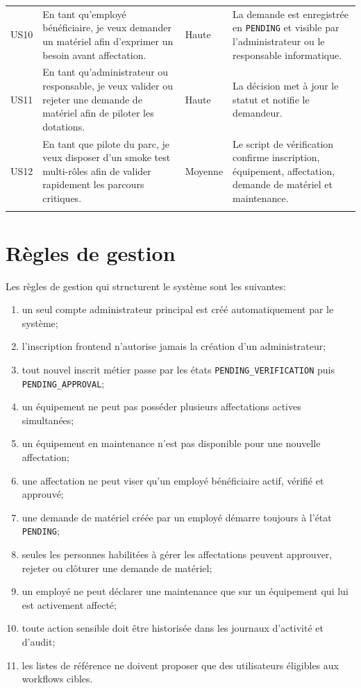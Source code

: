 ﻿\documentclass[12pt,a4paper,oneside]{report}
\begin{document}
\begin{longtable}{p{1.5cm}p{4.8cm}p{3cm}p{5.1cm}}
US10 & En tant qu'employé bénéficiaire, je veux demander un matériel afin d'exprimer un besoin avant affectation. & Haute & La demande est enregistrée en \texttt{PENDING} et visible par l'administrateur ou le responsable informatique. \\
US11 & En tant qu'administrateur ou responsable, je veux valider ou rejeter une demande de matériel afin de piloter les dotations. & Haute & La décision met à jour le statut et notifie le demandeur. \\
US12 & En tant que pilote du parc, je veux disposer d'un smoke test multi-rôles afin de valider rapidement les parcours critiques. & Moyenne & Le script de vérification confirme inscription, équipement, affectation, demande de matériel et maintenance. \\
\bottomrule
\label{tab:user-stories}
\end{longtable}

\section{Règles de gestion}
Les règles de gestion qui structurent le système sont les suivantes:
\begin{enumerate}
  \item un seul compte administrateur principal est créé automatiquement par le système;
  \item l'inscription frontend n'autorise jamais la création d'un administrateur;
  \item tout nouvel inscrit métier passe par les états \texttt{PENDING\_VERIFICATION} puis \texttt{PENDING\_APPROVAL};
  \item un équipement ne peut pas posséder plusieurs affectations actives simultanées;
  \item un équipement en maintenance n'est pas disponible pour une nouvelle affectation;
  \item une affectation ne peut viser qu'un employé bénéficiaire actif, vérifié et approuvé;
  \item une demande de matériel créée par un employé démarre toujours à l'état \texttt{PENDING};
  \item seules les personnes habilitées à gérer les affectations peuvent approuver, rejeter ou clôturer une demande de matériel;
  \item un employé ne peut déclarer une maintenance que sur un équipement qui lui est activement affecté;
  \item toute action sensible doit être historisée dans les journaux d'activité et d'audit;
  \item les listes de référence ne doivent proposer que des utilisateurs éligibles aux workflows cibles.
\end{enumerate}
\end{document}

